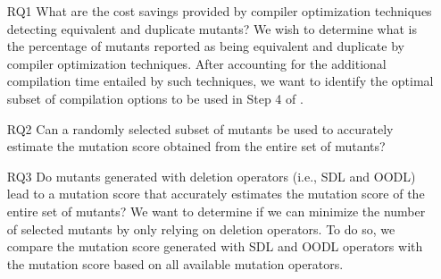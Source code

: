 \begin{itemize}

    \item[RQ1]  What are the cost savings provided by compiler optimization techniques detecting equivalent and duplicate mutants?
    We wish to determine what is the percentage of mutants reported as being equivalent and duplicate by compiler optimization techniques. After accounting for the additional compilation time entailed by such techniques, we want to identify the optimal subset of compilation options to be used in Step 4 of \APPR.

    \item[RQ2]  Can a randomly selected subset of mutants be used to accurately estimate the mutation score obtained from the entire set of mutants? 



    \item[RQ3]  {Do mutants generated with deletion operators (i.e., SDL and OODL) lead to a mutation score that accurately estimates the mutation score of the entire set of mutants?  
   We want to determine if we can minimize the number of selected mutants by only relying on deletion operators. To do so, we compare the mutation score generated with SDL and OODL operators with the mutation score based on all available mutation operators. }
    

\end{itemize}

